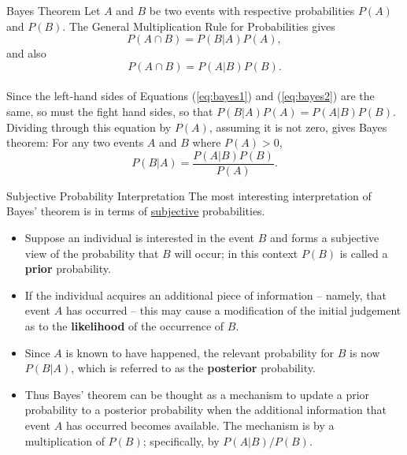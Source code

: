\documentclass[pdf]{beamer}
\newcommand{\empr}[1]{{\color{franklinblue}\textbf{#1}}}
\theoremstyle{remark}
\theoremstyle{definition}
\begin{document}
\begin{frame}[t]{Bayes Theorem}
 Let $A$ and $B$ be two events with respective probabilities $P(A)$ and $P(B)$.  The General Multiplication Rule for Probabilities gives
\begin{equation} \label{eq:bayes1} 
P(A \cap B) = P(B|A)P(A), 
\end{equation}
and also
\begin{equation} \label{eq:bayes2} 
P(A \cap B) = P(A|B)P(B). 
\end{equation}
\\
\vspace{0.5ex}
Since the left-hand sides of Equations (\ref{eq:bayes1}) and (\ref{eq:bayes2}) are the same, so must the fight hand sides, so that $P(B|A)P(A)  = P(A|B)P(B)$. Dividing through this equation by $P(A)$, assuming it is not zero, gives Bayes theorem:  For any two events $A$ and $B$ where $P(A) >0$,
\vspace{0.5ex}
\begin{equation} \label{eq:bayes3} 
P(B|A) = \frac{P(A|B)P(B)}{P(A)}. 
\end{equation}
\end{frame}

\begin{frame}[t]{Subjective Probability Interpretation}
The most interesting interpretation of Bayes' theorem is in terms of \underline{subjective} probabilities. \\
\vspace{0.5ex}
\small
\begin{itemize}
  \item Suppose an individual is interested in the event $B$ and forms a subjective view of the probability that $B$ will occur;  in this context $P(B)$ is called a \empr{prior} probability. 
  \item If the individual acquires an additional piece of information -- namely, that event $A$ has occurred -- this may cause a modification of the initial judgement as to the \empr{likelihood} of the occurrence of $B$. 
  \item Since $A$ is known to have happened, the relevant probability for $B$ is now $P(B|A)$, which is referred to as the \empr{posterior} probability.
  \item Thus Bayes' theorem can be thought as a mechanism to update a prior probability to a posterior probability when the additional information that event $A$ has occurred becomes available. The mechanism is by a multiplication of $P(B)$;  specifically, by $P(A|B)/P(B)$. \\
\end{itemize}
\end{frame}
\end{document}
